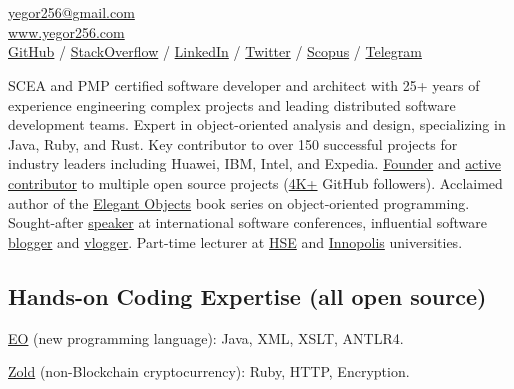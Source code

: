\documentclass{yb}
\begin{document}
\ybPrintPhoto{}

\section*{\Large {}}

\small

\href{mailto:yegor256@gmail.com}{yegor256@gmail.com}\\%
\href{https://www.yegor256.com}{www.yegor256.com}\\%
\href{https://github.com/yegor256}{GitHub} /
\href{https://stackexchange.com/users/63162/yegor256}{StackOverflow} /
\href{https://www.linkedin.com/in/yegor256}{LinkedIn} /
\href{https://twitter.com/intent/follow?screen_name=yegor256}{Twitter} /
\href{https://www.scopus.com/authid/detail.uri?authorId=30367443600}{Scopus} /
\href{https://t.me/yegor256news}{Telegram}

\vspace*{12pt}

SCEA and PMP certified software developer and architect with 25+ years of
experience engineering complex projects and leading distributed software
development teams. Expert in object-oriented analysis and design, specializing
in Java, Ruby, and Rust. Key contributor to over 150 successful projects for
industry leaders including Huawei, IBM, Intel, and Expedia.
\href{https://www.yegor256.com/pets.html}{Founder} and
\href{https://github.com/yegor256}{active contributor} to multiple open source
projects (\href{https://github.com/yegor256}{4K+} GitHub followers). Acclaimed
author of the \href{https://www.yegor256.com/elegant-objects.html}
{Elegant Objects} book series on object-oriented programming.
Sought-after \href{https://www.yegor256.com/talks.html}{speaker} at
international software conferences, influential software
\href{https://www.yegor256.com}{blogger} and
\href{https://www.youtube.com/c/yegor256}{vlogger}. Part-time lecturer at
\href{https://www.hse.ru/en/}{HSE} and \href{https://innopolis.university/en/}
{Innopolis} universities.

\subsection*{Hands-on Coding Expertise (all open source)}

\href{https://www.eolang.org}{EO} (new programming language):
Java, XML, XSLT, ANTLR4.

\href{https://www.zold.io}{Zold} (non-Blockchain cryptocurrency):
Ruby, HTTP, Encryption.
\end{document}
